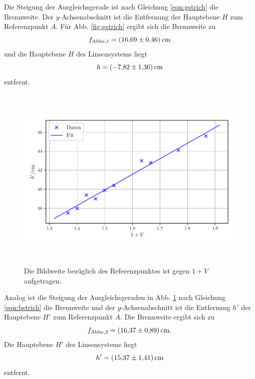 \noindent Die Steigung der Ausgleichsgerade ist nach Gleichung \eqref{eqn:gstrich} die Brennweite.
Der $y$-Achsenabschnitt ist die Entfernung der Hauptebene $H$ zum Referenzpunkt $A$.
Für Abb. \ref{fig:gstrich} ergibt sich die Brennweite zu 
\begin{equation*}
    f_\text{Abbe,1} = \SI{16.69 \pm 0.46}{\centi\meter}
\end{equation*}
und die Hauptebene $H$ des Linsensystems liegt
\begin{equation*}
    h = \SI{-7.82 \pm 1.36}{\centi\meter}
\end{equation*}
entfernt.

\begin{figure}
    \centering
    \includegraphics[width=14cm, height=9cm]{build/abbe_b.pdf}
    \caption{Die Bildweite bezüglich des Referenzpunktes ist gegen $1 + V$ aufgetragen.}
    \label{fig:bstrich}
\end{figure}

\noindent Analog ist die Steigung der Ausgleichsgeraden in Abb. \ref{fig:bstrich} nach Gleichung \eqref{eqn:bstrich} die Brennweite und der $y$-Achsenabschnitt ist die Entfernung $h'$ der Hauptebene $H'$ zum Referenzpunkt $A$.
Die Brennweite ergibt sich zu 
\begin{equation*}
    f_\text{Abbe,2} = \SI{16.37 \pm 0.89}{\centi\meter}.
\end{equation*}
Die Hauptebene $H'$ des Linsensystems liegt
\begin{equation*}
    h' = \SI{15.37 \pm 1.41}{\centi\meter}
\end{equation*}
entfernt.

